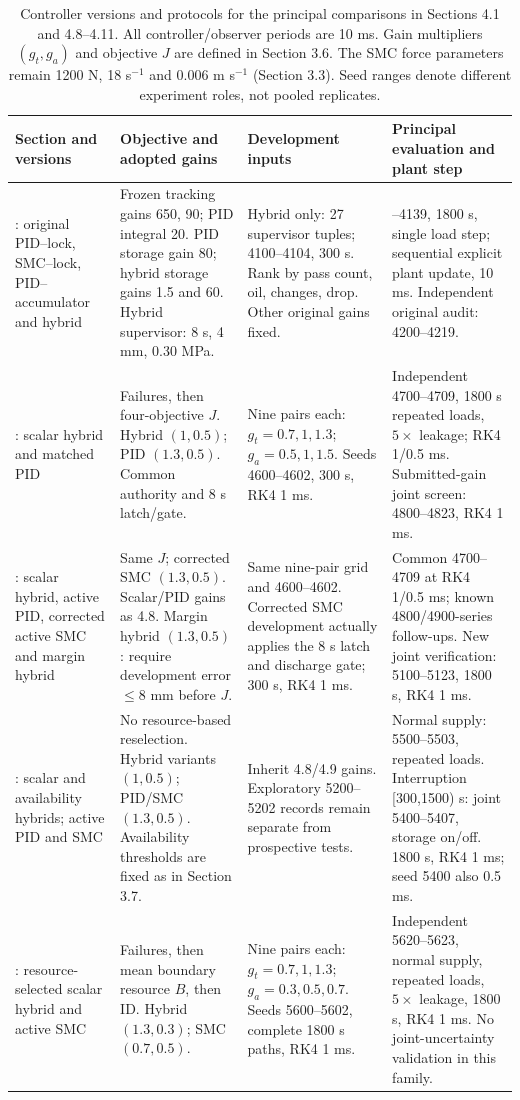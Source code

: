 \begin{table}[H]\centering\small
\caption{Controller versions and protocols for the principal comparisons in Sections 4.1 and 4.8--4.11. All controller/observer periods are 10 ms. Gain multipliers $(g_t,g_a)$ and objective $J$ are defined in Section 3.6. The SMC force parameters remain 1200 N, 18 s$^{-1}$ and 0.006 m s$^{-1}$ (Section 3.3). Seed ranges denote different experiment roles, not pooled replicates.}\label{tab:comparison-map}
\begin{tabularx}{\linewidth}{@{}>{\raggedright\arraybackslash}p{.15\linewidth}>{\raggedright\arraybackslash}p{.29\linewidth}>{\raggedright\arraybackslash}p{.23\linewidth}>{\raggedright\arraybackslash}X@{}}\toprule
Section and versions & Objective and adopted gains & Development inputs & Principal evaluation and plant step\\\midrule
4.1: original PID--lock, SMC--lock, PID--accumulator and hybrid & Frozen tracking gains 650, 90; PID integral 20. PID storage gain 80; hybrid storage gains 1.5 and 60. Hybrid supervisor: 8 s, 4 mm, 0.30 MPa. & Hybrid only: 27 supervisor tuples; 4100--4104, 300 s. Rank by pass count, oil, changes, drop. Other original gains fixed. & 4120--4139, 1800 s, single load step; sequential explicit plant update, 10 ms. Independent original audit: 4200--4219.\\\addlinespace
4.8: scalar hybrid and matched PID & Failures, then four-objective $J$. Hybrid $(1,0.5)$; PID $(1.3,0.5)$. Common authority and 8 s latch/gate. & Nine pairs each: $g_t=0.7,1,1.3$; $g_a=0.5,1,1.5$. Seeds 4600--4602, 300 s, RK4 1 ms. & Independent 4700--4709, 1800 s repeated loads, $5\times$ leakage; RK4 1/0.5 ms. Submitted-gain joint screen: 4800--4823, RK4 1 ms.\\\addlinespace
4.9: scalar hybrid, active PID, corrected active SMC and margin hybrid & Same $J$; corrected SMC $(1.3,0.5)$. Scalar/PID gains as 4.8. Margin hybrid $(1.3,0.5)$: require development error $\le8$ mm before $J$. & Same nine-pair grid and 4600--4602. Corrected SMC development actually applies the 8 s latch and discharge gate; 300 s, RK4 1 ms. & Common 4700--4709 at RK4 1/0.5 ms; known 4800/4900-series follow-ups. New joint verification: 5100--5123, 1800 s, RK4 1 ms.\\\addlinespace
4.10: scalar and availability hybrids; active PID and SMC & No resource-based reselection. Hybrid variants $(1,0.5)$; PID/SMC $(1.3,0.5)$. Availability thresholds are fixed as in Section 3.7. & Inherit 4.8/4.9 gains. Exploratory 5200--5202 records remain separate from prospective tests. & Normal supply: 5500--5503, repeated loads. Interruption [300,1500) s: joint 5400--5407, storage on/off. 1800 s, RK4 1 ms; seed 5400 also 0.5 ms.\\\addlinespace
4.11: resource-selected scalar hybrid and active SMC & Failures, then mean boundary resource $B$, then ID. Hybrid $(1.3,0.3)$; SMC $(0.7,0.5)$. & Nine pairs each: $g_t=0.7,1,1.3$; $g_a=0.3,0.5,0.7$. Seeds 5600--5602, complete 1800 s paths, RK4 1 ms. & Independent 5620--5623, normal supply, repeated loads, $5\times$ leakage, 1800 s, RK4 1 ms. No joint-uncertainty validation in this family.\\\bottomrule
\end{tabularx}
\end{table}
